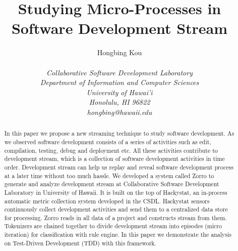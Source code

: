 \documentclass[11pt,twocolumn]{article}
\begin{document}
\title{Studying Micro-Processes in Software Development Stream}
\author{\protect\begin{tabular}{ccc}
Hongbing Kou \\
\end{tabular}\\
\em  Collaborative Software Development Laboratory \\
\em  Department of Information and Computer Sciences \\
\em  University of Hawai'i \\
\em  Honolulu, HI 96822 \\
\em  hongbing@hawaii.edu}
\maketitle
\thispagestyle{empty}

\begin{abstract}  %
  In this paper we propose a new streaming technique to study software
  development. As we observed software development consists of a series of
  activities such as edit, compilation, testing, debug and deployment etc.
  All these activities contribute to development stream, which is a
  collection of software development activities in time order. Development
  stream can help us replay and reveal software development process at a
  later time without too much hassle. We developed a system called Zorro to
  generate and analyze development stream at Collaborative Software
  Development Laboratory in University of Hawaii. It is built on the top of
  Hackystat\cite{csdl2-02-07}, an in-process automatic metric collection
  system developed in the CSDL.  Hackystat sensors continuously collect
  development activities and send them to a centralized data store for
  processing. Zorro reads in all data of a project and constructs stream
  from them. Tokenizers are chained together to divide development stream
  into episodes (micro iteration) for classification with rule engine. In
  this paper we demonstrate the analysis on Test-Driven Development (TDD)
  with this framework.
\end{abstract}
\end{document}
